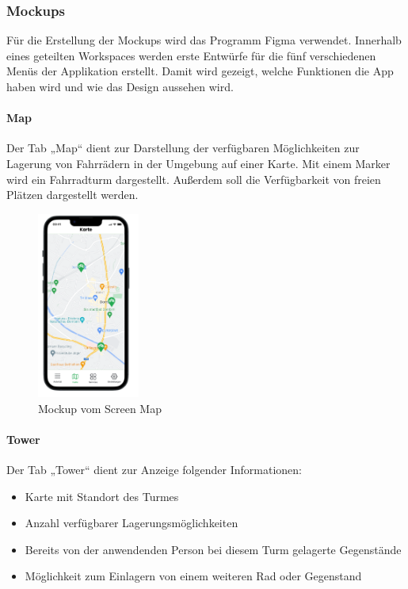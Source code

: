 \subsubsection{Mockups}
Für die Erstellung der \Gls{Mockup}s wird das Programm Figma verwendet. Innerhalb eines geteilten Workspaces werden erste Entwürfe für die fünf verschiedenen Menüs der Applikation erstellt. Damit wird gezeigt, welche Funktionen die App haben wird und wie das Design aussehen wird.

\bigskip


\paragraph{Map}Der \Gls{Tab} „Map“ dient zur Darstellung der verfügbaren Möglichkeiten zur Lagerung von Fahrrädern in der Umgebung auf einer Karte. Mit einem Marker wird ein Fahrradturm dargestellt. Außerdem soll die Verfügbarkeit von freien Plätzen dargestellt werden.

\begin{figure}[H]
  \centering
  \includegraphics[width=0.3\textwidth]{images/app_mock_map}
  \caption{\Gls{Mockup} vom Screen Map}
  \label{fig:screenmapmock}
\end{figure}

\bigskip


\paragraph{Tower}Der \Gls{Tab} „Tower“ dient zur Anzeige folgender Informationen:

\begin{itemize}
  \item Karte mit Standort des Turmes
  \item Anzahl verfügbarer Lagerungsmöglichkeiten
  \item Bereits von der anwendenden Person bei diesem Turm gelagerte Gegenstände
  \item Möglichkeit zum Einlagern von einem weiteren Rad oder Gegenstand
\end{itemize}

